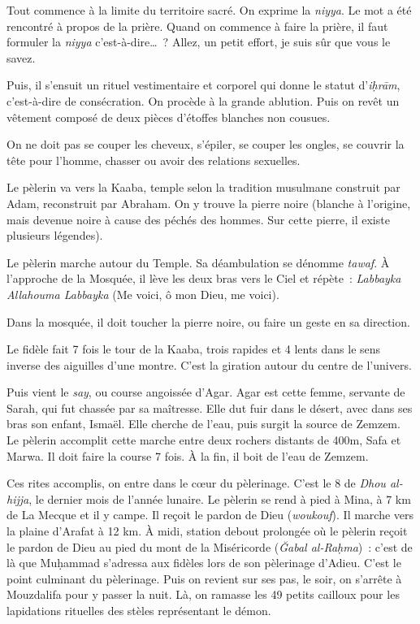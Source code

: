 Tout commence à la limite du territoire sacré. On exprime la
\emph{niyya}. Le mot a été rencontré à propos de la prière. Quand on
commence à faire la prière, il faut formuler la \emph{niyya}
c'est-à-dire\ldots~? Allez, un petit effort, je suis sûr que vous le
savez.

Puis, il s'ensuit un rituel vestimentaire et corporel qui donne le
statut d'\emph{iḥrām}, c'est-à-dire de consécration. On procède à la
grande ablution. Puis on revêt un vêtement composé de deux pièces
d'étoffes blanches non cousues.

On ne doit pas se couper les cheveux, s'épiler, se couper les ongles, se
couvrir la tête pour l'homme, chasser ou avoir des relations sexuelles.

Le pèlerin va vers la Kaaba, temple selon la tradition musulmane
construit par Adam, reconstruit par Abraham. On y trouve la pierre noire
(blanche à l'origine, mais devenue noire à cause des péchés des hommes.
Sur cette pierre, il existe plusieurs légendes).

Le pèlerin marche autour du Temple. Sa déambulation se dénomme
\emph{tawaf}. À l'approche de la Mosquée, il lève les deux bras vers le
Ciel et répète~: \emph{Labbayka Allahouma Labbayka} (Me voici, ô mon
Dieu, me voici).

Dans la mosquée, il doit toucher la pierre noire, ou faire un geste en
sa direction.

Le fidèle fait 7 fois le tour de la Kaaba, trois rapides et 4 lents dans
le sens inverse des aiguilles d'une montre. C'est la giration autour du
centre de l'univers.

Puis vient le \emph{say}, ou course angoissée d'Agar. Agar est cette
femme, servante de Sarah, qui fut chassée par sa maîtresse. Elle dut
fuir dans le désert, avec dans ses bras son enfant, Ismaël. Elle cherche
de l'eau, puis surgit la source de Zemzem. Le pèlerin accomplit cette
marche entre deux rochers distants de 400m, Safa et Marwa. Il doit faire
la course 7 fois. À la fin, il boit de l'eau de Zemzem.

Ces rites accomplis, on entre dans le cœur du pèlerinage. C'est le 8 de
\emph{Dhou al-hijja}, le dernier mois de l'année lunaire. Le pèlerin se
rend à pied à Mina, à 7 km de La Mecque et il y campe. Il reçoit le
pardon de Dieu (\emph{woukouf}). Il marche vers la plaine d'Arafat à 12
km. À midi, station debout prolongée où le pèlerin reçoit le pardon de
Dieu au pied du mont de la Miséricorde (\emph{Ğabal al-Raḥma})~: c'est
de là que Muḥammad s'adressa aux fidèles lors de son pèlerinage d'Adieu.
C'est le point culminant du pèlerinage. Puis on revient sur ses pas, le
soir, on s'arrête à Mouzdalifa pour y passer la nuit. Là, on ramasse les
49 petits cailloux pour les lapidations rituelles des stèles
représentant le démon.

